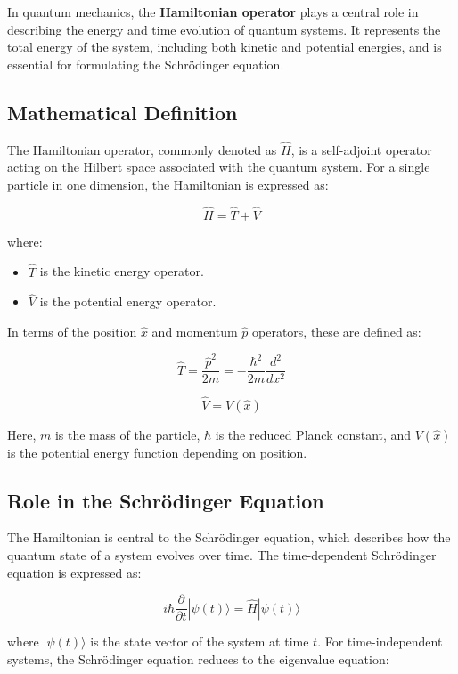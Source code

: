 In quantum mechanics, the \textbf{Hamiltonian operator} plays a central role in describing the energy and time evolution of quantum systems. It represents the total energy of the system, including both kinetic and potential energies, and is essential for formulating the Schrödinger equation.

\subsection{Mathematical Definition}

The Hamiltonian operator, commonly denoted as \( \hat{H} \), is a self-adjoint operator acting on the Hilbert space associated with the quantum system. For a single particle in one dimension, the Hamiltonian is expressed as:

\[
\hat{H} = \hat{T} + \hat{V}
\]

where:

\begin{itemize}
    \item \( \hat{T} \) is the kinetic energy operator.
    \item \( \hat{V} \) is the potential energy operator.
\end{itemize}

In terms of the position \( \hat{x} \) and momentum \( \hat{p} \) operators, these are defined as:

\[
\hat{T} = \frac{\hat{p}^2}{2m} = -\frac{\hbar^2}{2m} \frac{d^2}{dx^2}
\]

\[
\hat{V} = V(\hat{x})
\]

Here, \( m \) is the mass of the particle, \( \hbar \) is the reduced Planck constant, and \( V(\hat{x}) \) is the potential energy function depending on position.

\subsection{Role in the Schrödinger Equation}

The Hamiltonian is central to the Schrödinger equation, which describes how the quantum state of a system evolves over time. The time-dependent Schrödinger equation is expressed as:

\[
i\hbar \frac{\partial}{\partial t} |\psi(t)\rangle = \hat{H} |\psi(t)\rangle
\]

where \( |\psi(t)\rangle \) is the state vector of the system at time \( t \). For time-independent systems, the Schrödinger equation reduces to the eigenvalue equation:

